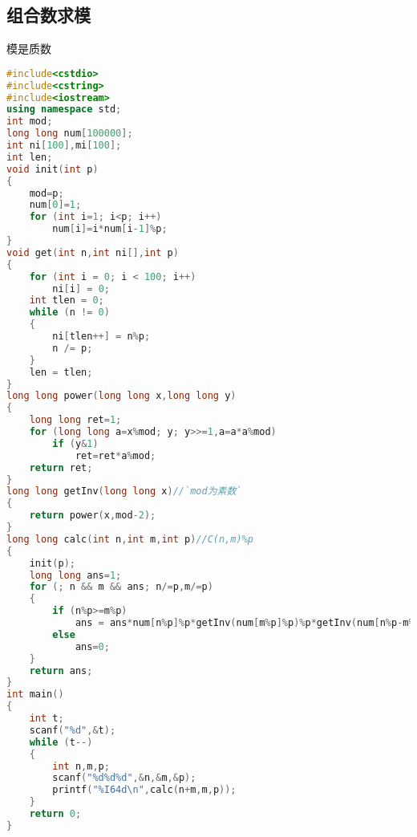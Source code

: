 \subsection{组合数求模}
	模是质数
	\begin{lstlisting}[language=c++]
#include<cstdio>
#include<cstring>
#include<iostream>
using namespace std;
int mod;
long long num[100000];
int ni[100],mi[100];
int len;
void init(int p)
{
	mod=p;
	num[0]=1;
	for (int i=1; i<p; i++)
		num[i]=i*num[i-1]%p;
}
void get(int n,int ni[],int p)
{
	for (int i = 0; i < 100; i++)
		ni[i] = 0;
	int tlen = 0;
	while (n != 0)
	{
		ni[tlen++] = n%p;
		n /= p;
	}
	len = tlen;
}
long long power(long long x,long long y)
{
	long long ret=1;
	for (long long a=x%mod; y; y>>=1,a=a*a%mod)
		if (y&1)
			ret=ret*a%mod;
	return ret;
}
long long getInv(long long x)//`mod为素数`
{
	return power(x,mod-2);
}
long long calc(int n,int m,int p)//C(n,m)%p
{
	init(p);
	long long ans=1;
	for (; n && m && ans; n/=p,m/=p)
	{
		if (n%p>=m%p)
			ans = ans*num[n%p]%p*getInv(num[m%p]%p)%p*getInv(num[n%p-m%p])%p;
		else
			ans=0;
	}
	return ans;
}
int main()
{
	int t;
	scanf("%d",&t);
	while (t--)
	{
		int n,m,p;
		scanf("%d%d%d",&n,&m,&p);
		printf("%I64d\n",calc(n+m,m,p));
	}
	return 0;
}
	\end{lstlisting}
